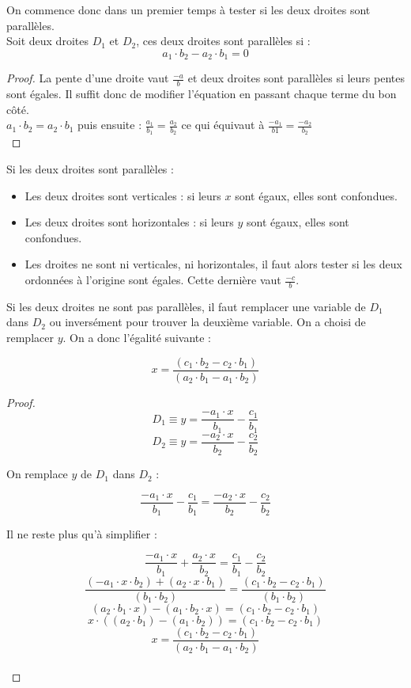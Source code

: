 \documentclass[]{report}
\begin{document}
On commence donc dans un premier temps à tester si les deux droites sont parallèles. \\

Soit deux droites $D_1$ et $D_2$, ces deux droites sont parallèles si : 
$$ a_1 \cdot b_2 - a_2 \cdot b_1 = 0 $$

\begin{proof}
La pente d'une droite vaut $\frac{-a}{b}$ et deux droites sont parallèles
si leurs pentes sont égales. Il suffit donc de modifier l'équation en passant chaque terme du bon côté. \\
$ a_1 \cdot b_2 = a_2 \cdot b_1 $ puis ensuite : $ \frac{a_1}{b_1} = \frac{a_2}{b_2} $ ce qui équivaut à
$ \frac{-a_1}{b1} = \frac{-a_2}{b_2} $ \\
\end{proof}

Si les deux droites sont parallèles : 
\begin{itemize}
    \item Les deux droites sont verticales : si leurs $x$ sont égaux, elles sont confondues.
    \item Les deux droites sont horizontales : si leurs $y$ sont égaux, elles sont confondues.
    \item Les droites ne sont ni verticales, ni horizontales, il faut alors tester si les deux
        ordonnées à l'origine sont égales. Cette dernière vaut $\frac{-c}{b}$. \\
\end{itemize}

Si les deux droites ne sont pas parallèles, il faut remplacer une variable de $D_1$ dans $D_2$
ou inversément pour trouver la deuxième variable. On a choisi de remplacer $y$.
On a donc l'égalité suivante : 

$$ x = \frac{(c_1 \cdot b_2 - c_2 \cdot b_1)}{(a_2 \cdot b_1 - a_1 \cdot b_2)} $$

\begin{proof}
$$ D_1 \equiv y = \frac{-a_1 \cdot x}{b_1} - \frac{c_1}{b_1} $$
$$ D_2 \equiv y = \frac{-a_2 \cdot x}{b_2} - \frac{c_2}{b_2} $$

On remplace $y$ de $D_1$ dans $D_2$ :

$$ \frac{-a_1 \cdot x}{b_1} - \frac{c_1}{b_1} = \frac{-a_2 \cdot x}{b_2} - \frac{c_2}{b_2} $$

Il ne reste plus qu'à simplifier :

$$ \frac{-a_1 \cdot x}{b_1} + \frac{a_2 \cdot x}{b_2} = \frac{c_1}{b_1} - \frac{c_2}{b_2} $$
$$ \frac{(-a_1 \cdot x \cdot b_2) + (a_2 \cdot x \cdot b_1)}{(b_1 \cdot b_2)} = \frac{(c_1 \cdot b_2 - c_2 \cdot b_1)}{(b_1 \cdot b_2)} $$
$$ (a_2 \cdot b_1 \cdot x) - (a_1 \cdot b_2 \cdot x) = (c_1 \cdot b_2 - c_2 \cdot b_1) $$
$$ x \cdot ((a_2 \cdot b_1) - (a_1 \cdot b_2)) = (c_1 \cdot b_2 - c_2 \cdot b_1) $$
$$ x = \frac{(c_1 \cdot b_2 - c_2 \cdot b_1)}{(a_2 \cdot b_1 - a_1 \cdot b_2)} $$ \\
\end{proof}
\end{document}
